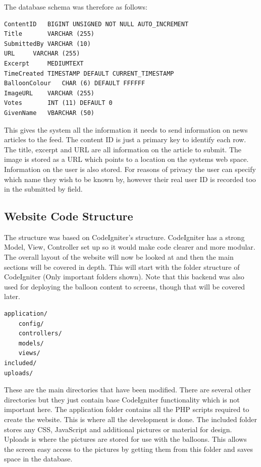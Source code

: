 The database schema was therefore as follows: 

\begin{verbatim}ContentID	BIGINT UNSIGNED NOT NULL AUTO_INCREMENT
Title		VARCHAR (255)
SubmittedBy	VARCHAR (10)
URL		VARCHAR (255)
Excerpt		MEDIUMTEXT
TimeCreated	TIMESTAMP DEFAULT CURRENT_TIMESTAMP
BalloonColour	CHAR (6) DEFAULT FFFFFF
ImageURL	VARCHAR (255)
Votes		INT (11) DEFAULT 0
GivenName	VBARCHAR (50)\end{verbatim}

This gives the system all the information it needs to send information on news articles to the feed. The content ID is just a primary key to identify each row. The title, excerpt and URL are all information on the article to submit. The image is stored as a URL which points to a location on the systems web space. Information on the user is also stored. For reasons of privacy the user can specify which name they wish to be known by, however their real user ID is recorded too in the submitted by field.

\subsection{Website Code Structure}
The structure was based on CodeIgniter's structure. CodeIgniter has a strong Model, View, Controller set up so it would make code clearer and more modular. The overall layout of the website will now be looked at and then the main sections will be covered in depth. This will start with the folder structure of CodeIgniter (Only important folders shown). Note that this backend was also used for deploying the balloon content to screens, though that will be covered later.

\begin{verbatim}application/
	config/
	controllers/
	models/
	views/
included/
uploads/\end{verbatim}

These are the main directories that have been modified. There are several other directories but they just contain base CodeIgniter functionality which is not important here. The application folder contains all the PHP scripts required to create the website. This is where all the development is done. The included folder stores any CSS, JavaScript and additional pictures or material for design. Uploads is where the pictures are stored for use with the balloons. This allows the screen easy access to the pictures by getting them from this folder and saves space in the database.

